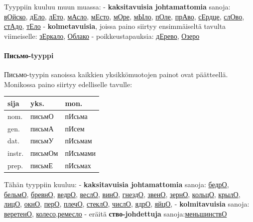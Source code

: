 \documentclass[]{scrartcl}
\begin{document}
Tyyppiin kuuluu muun muassa: - \textbf{kaksitavuisia johtamattomia}
sanoja: \href{http://ru.wiktionary.org/wiki/войско}{вОйско},
\href{http://ru.wiktionary.org/wiki/дело}{дЕло},
\href{http://ru.wiktionary.org/wiki/лето}{лЕто},
\href{http://ru.wiktionary.org/wiki/масло}{мАсло},
\href{http://ru.wiktionary.org/wiki/место}{мЕсто},
\href{http://ru.wiktionary.org/wiki/море}{мОре},
\href{http://ru.wiktionary.org/wiki/мыло}{мЫло},
\href{http://ru.wiktionary.org/wiki/поле}{пОле},
\href{http://ru.wiktionary.org/wiki/право}{прАво},
\href{http://ru.wiktionary.org/wiki/сердце}{сЕрдце},
\href{http://ru.wiktionary.org/wiki/слово}{слОво},
\href{http://ru.wiktionary.org/wiki/стадо}{стАдо},
\href{http://ru.wiktionary.org/wiki/тело}{тЕло} -
\textbf{kolmetavuisia}, joissa paino siirtyy ensimmäiseltä tavulta
viimeiselle: \href{http://ru.wiktionary.org/wiki/зеркало}{зЕркало},
\href{http://ru.wiktionary.org/wiki/облако}{Облако} - poikkeustapauksia:
\href{http://ru.wiktionary.org/wiki/дерево}{дЕрево},
\href{http://ru.wiktionary.org/wiki/озеро}{Озеро}

\paragraph{Письмо-tyyppi}\label{ux43fux438ux441ux44cux43cux43e-tyyppi}

Письмо-tyypin sanoissa kaikkien yksikkömuotojen painot ovat päätteellä.
Monikossa paino siirtyy edelliselle tavulle:

\begin{longtable}[c]{@{}lll@{}}
\toprule
sija & yks. & mon.\tabularnewline
\midrule
\endhead
nom. & письмО & пИсьма\tabularnewline
gen. & письмА & пИсем\tabularnewline
dat. & письмУ & пИсьмам\tabularnewline
instr. & письмОм & пИсьмами\tabularnewline
prep. & письмЕ & пИсьмах\tabularnewline
\bottomrule
\end{longtable}

Tähän tyyppiin kuuluu: - \textbf{kaksitavuisia johtamattomia} sanoja:
\href{http://ru.wiktionary.org/wiki/бедро}{бедрО},
\href{http://ru.wiktionary.org/wiki/бельмо}{бельмО},
\href{http://ru.wiktionary.org/wiki/бревно}{бревнО},
\href{http://ru.wiktionary.org/wiki/ведро}{ведрО},
\href{http://ru.wiktionary.org/wiki/весло}{веслО},
\href{http://ru.wiktionary.org/wiki/вино}{винО},
\href{http://ru.wiktionary.org/wiki/гнездо}{гнездО},
\href{http://ru.wiktionary.org/wiki/звено}{звенО},
\href{http://ru.wiktionary.org/wiki/зерно}{зернО},
\href{http://ru.wiktionary.org/wiki/кольцо}{кольцО},
\href{http://ru.wiktionary.org/wiki/крыло}{крылО},
\href{http://ru.wiktionary.org/wiki/лицо}{лицО},
\href{http://ru.wiktionary.org/wiki/окно}{окнО},
\href{http://ru.wiktionary.org/wiki/перо}{перО},
\href{http://ru.wiktionary.org/wiki/плечо}{плечО},
\href{http://ru.wiktionary.org/wiki/стекло}{стеклО},
\href{http://ru.wiktionary.org/wiki/число}{числО},
\href{http://ru.wiktionary.org/wiki/ядро}{ядрО},
\href{http://ru.wiktionary.org/wiki/яйцо}{яйцО}, -
\textbf{kolmitavuisia} sanoja:
\href{http://ru.wiktionary.org/wiki/веретено}{веретенО},
\href{http://ru.wiktionary.org/wiki/колесо}{колесо},\href{http://ru.wiktionary.org/wiki/ремесло}{ремесло}
- eräitä \textbf{ство-johdettuja}
sanoja:\href{http://ru.wiktionary.org/wiki/меньшинство}{меньшинствО}
\end{document}
